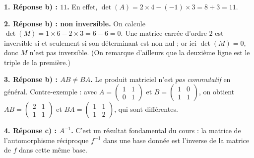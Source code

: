 \documentclass[11pt]{article}
\begin{document}
\begin{corrige}
\textbf{1. Réponse b) : $11$.} En effet, $\det(A) = 2\times 4 - (-1)\times 3 = 8 + 3 = 11$.

\textbf{2. Réponse b) : non inversible.} On calcule $\det(M) = 1\times 6 - 2\times 3 = 6 - 6 = 0$. Une matrice carrée d'ordre $2$ est inversible si et seulement si son déterminant est non nul ; or ici $\det(M)=0$, donc $M$ n'est pas inversible. (On remarque d'ailleurs que la deuxième ligne est le triple de la première.)

\textbf{3. Réponse b) : $AB \neq BA$.} Le produit matriciel n'est \emph{pas commutatif} en général. Contre-exemple : avec $A = \begin{pmatrix} 1 & 1 \\ 0 & 1 \end{pmatrix}$ et $B = \begin{pmatrix} 1 & 0 \\ 1 & 1 \end{pmatrix}$, on obtient $AB = \begin{pmatrix} 2 & 1 \\ 1 & 1 \end{pmatrix}$ et $BA = \begin{pmatrix} 1 & 1 \\ 1 & 2 \end{pmatrix}$, qui sont différentes.

\textbf{4. Réponse c) : $A^{-1}$.} C'est un résultat fondamental du cours : la matrice de l'automorphisme réciproque $f^{-1}$ dans une base donnée est l'inverse de la matrice de $f$ dans cette même base.
\end{corrige}
\end{document}

